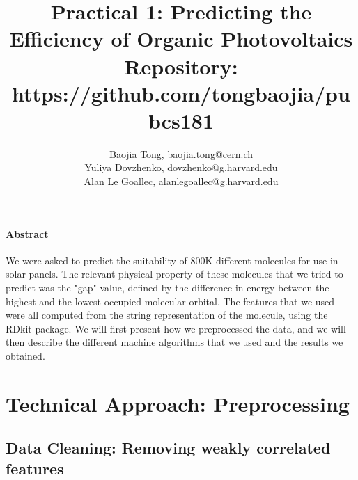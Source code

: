 \documentclass[11pt]{article}
\title{Practical 1: Predicting the Efficiency of Organic Photovoltaics\\Repository: https://github.com/tongbaojia/pubcs181}
\author{Baojia Tong, baojia.tong@cern.ch \\ Yuliya Dovzhenko, dovzhenko@g.harvard.edu \\ Alan Le Goallec, alanlegoallec@g.harvard.edu}
\begin{document}
\maketitle{}

\paragraph{Abstract}
We were asked to predict the suitability of 800K different molecules for use in solar panels. The relevant physical property of these molecules that we tried to predict was the "gap" value, defined by the difference in energy between the highest and the lowest occupied molecular orbital. The features that we used were all computed from the string representation of the molecule, using the RDkit package. We will first present how we preprocessed the data, and we will then describe the different machine algorithms that we used and the results we obtained.

\section{Technical Approach: Preprocessing}


  \subsection{Data Cleaning: Removing weakly correlated features}
\end{document}
